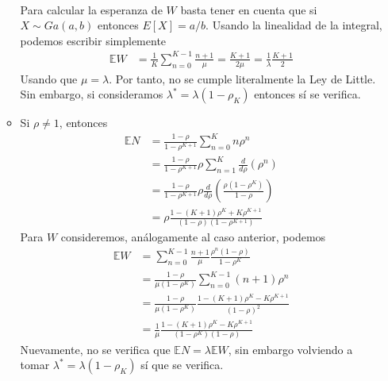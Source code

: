 \documentclass[twoside]{article}
\begin{document}
\begin{solucion}
\begin{enumerate}[(a)]
\begin{itemize}
\begin{align*}
\end{align*}
Para calcular la esperanza de $W$ basta tener en cuenta que si $X \sim Ga(a,b)$ entonces $E[X] = a/b$. Usando la linealidad de la integral, podemos escribir simplemente
\begin{align*}
\mathbb{E}W &= \frac{1}{K}\sum_{n=0}^{K-1} \frac{n+1}{\mu} = \frac{K+1}{2\mu} = \frac{1}{\lambda}\frac{K+1}{2}
\end{align*}
Usando que $\mu = \lambda$. Por tanto, no se cumple literalmente la Ley de Little. Sin embargo, si consideramos $\lambda^* = \lambda (1-\rho_K)$ entonces sí se verifica.
\item Si $\rho\neq 1$, entonces
\begin{align*}
\mathbb{E}N &= \frac{1-\rho}{1-\rho^{K+1}}\sum_{n=0}^K n \rho^n \\
& = \frac{1-\rho}{1-\rho^{K+1}}\rho \sum_{n=1}^K \frac{d}{d\rho}\left(\rho^n\right) \\
&=\frac{1-\rho}{1-\rho^{K+1}}\rho \frac{d}{d\rho}\left(\frac{\rho(1-\rho^K)}{1-\rho}\right)\\
&= \rho\frac{1-(K+1)\rho^K+K\rho^{K+1}}{(1-\rho)(1-\rho^{K+1})}
\end{align*}
Para $W$ consideremos, análogamente al caso anterior, podemos 
\begin{align*}
\mathbb{E}W &= \sum_{n=0}^{K-1} \frac{n+1}{\mu} \frac{\rho^n(1-\rho)}{1-\rho^K}\\
&= \frac{1-\rho}{\mu (1-\rho^{K})}\sum_{n=0}^{K-1} (n+1)\rho^n\\
&= \frac{1-\rho}{\mu(1-\rho^K)}\frac{1-(K+1)\rho^K-K\rho^{K+1}}{(1-\rho)^2}\\
&=\frac{1}{\mu}\frac{1-(K+1)\rho^K-K\rho^{K+1}}{(1-\rho^K)(1-\rho)}
\end{align*}
Nuevamente, no se verifica que $\mathbb{E}N = \lambda \mathbb{E}W$, sin embargo volviendo a tomar $\lambda^* = \lambda(1-\rho_K)$ sí que se verifica.
\end{itemize}
\end{enumerate}
\end{solucion}
\newpage
\end{document}
